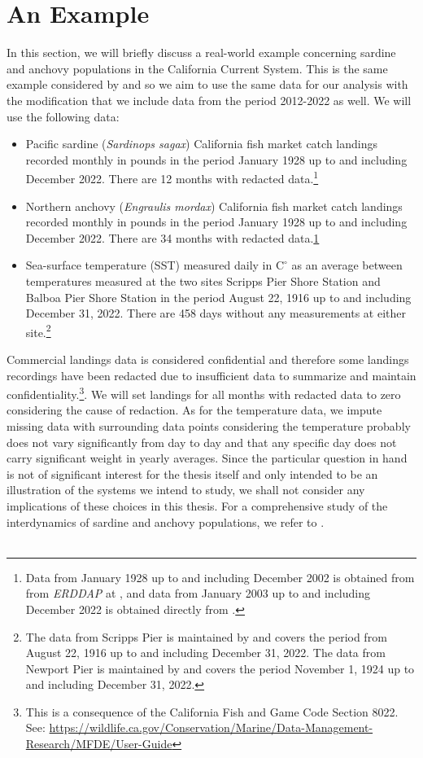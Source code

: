 \documentclass[11pt, a4paper]{memoir}
\theoremstyle{break}
\theoremstyle{break}
\theoremstyle{nonumberplain}
\begin{document}
\section*{An Example}
In this section, we will briefly discuss a real-world example concerning sardine and anchovy populations in the California Current System. This is the same example considered by \cite{Sugihara} and so we aim to use the same data for our analysis with the modification that we include data from the period 2012-2022 as well. We will use the following data:
\begin{itemize}
\item Pacific sardine (\textit{Sardinops sagax}) California fish market catch landings recorded monthly in pounds in the period January 1928 up to and including December 2022. There are 12 months with redacted data.\footnote{\label{note1}Data from January 1928 up to and including December 2002 is obtained from from \textit{ERDDAP} at \cite{oldData}, and data from January 2003 up to and including December 2022 is obtained directly from \cite{newData}.}
\item Northern anchovy (\textit{Engraulis mordax}) California fish market catch landings recorded monthly in pounds in the period January 1928 up to and including December 2022. There are 34 months with redacted data.\cref{note1} 
\item  Sea-surface temperature (SST) measured daily in $\text{C}^\circ$ as an average between temperatures measured at the two sites Scripps Pier Shore Station and Balboa Pier Shore Station in the period August 22, 1916 up to and including December 31, 2022. There are 458 days without any measurements at either site.\footnote{The data from Scripps Pier is maintained by \cite{Scripps} and covers the period from August 22, 1916 up to and including December 31, 2022. The data from Newport Pier is maintained by \cite{Newport} and covers the period November 1, 1924 up to and including December 31, 2022.} 
\end{itemize}
Commercial landings data is considered confidential and therefore some landings recordings have been redacted due to insufficient data to summarize and maintain confidentiality.\footnote{This is a consequence of the California Fish and Game Code Section 8022. See: \url{https://wildlife.ca.gov/Conservation/Marine/Data-Management-Research/MFDE/User-Guide}}. We will set landings for all months with redacted data to zero considering the cause of redaction. As for the temperature data, we impute missing data with surrounding data points considering the temperature probably does not vary significantly from day to day and that any specific day does not carry significant weight in yearly averages. Since the particular question in hand is not of significant interest for the thesis itself and only intended to be an illustration of the systems we intend to study, we shall not consider any implications of these choices in this thesis. For a comprehensive study of the interdynamics of sardine and anchovy populations, we refer to \cite{Sardine}.\\\\
\end{document}
